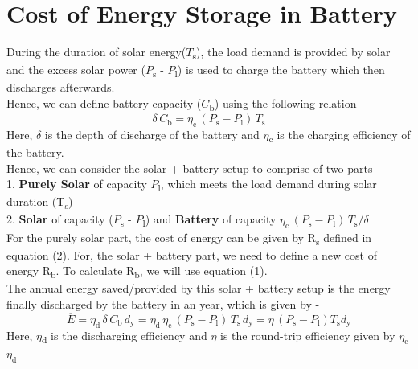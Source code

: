 \documentclass{article}
\newcommand{\Ebar}{\overline{E}}
\begin{document}
\section{Cost of Energy Storage in Battery}
During the duration of solar energy(\(T\)\textsubscript{s}), the load demand is provided by solar and the excess solar power (\(P\)\textsubscript{s} - \(P\)\textsubscript{l}) is used to charge the battery which then discharges afterwards.\\
\newline
Hence, we can define battery capacity (\(C\)\textsubscript{b}) using the following relation -
\begin{equation}
	\delta \, C_\text{b} = \eta_\text{c} \, (P_\text{s} - P_\text{l}) \, T_\text{s}
\end{equation} 
Here, \(\delta \) is the depth of discharge of the battery and \(\eta\)\textsubscript{c} is the charging efficiency of the battery.\\
\newline 
Hence, we can consider the solar + battery setup to comprise of two parts -\\
1. \textbf{Purely Solar} of capacity \(P\)\textsubscript{l}, which meets the load demand during solar duration (T\textsubscript{s})\\
2. \textbf{Solar} of capacity (\(P\)\textsubscript{s} - \(P\)\textsubscript{l}) and \textbf{Battery} of capacity $\eta_\text{c} \, (P_\text{s} - P_\text{l}) \, T_\text{s}/\delta$ \\
\newline
\newline
For the purely solar part, the cost of energy can be given by R\textsubscript{s} defined in equation (2). For, the solar + battery part, we need to define a new cost of energy R\textsubscript{b}. To calculate R\textsubscript{b}, we will use equation (1).\\
\newline
The annual energy saved/provided by this solar + battery setup is the energy finally discharged by the battery in an year, which is given by - \\
\[
    \Ebar = \eta_\text{d} \, \delta \, C_\text{b} \, d_\text{y} = \eta_\text{d} \, \eta_\text{c} \, (P_\text{s} - P_\text{l}) \, T_\text{s} \, d_\text{y} = \eta \, (P_\text{s} - P_\text{l}) T_\text{s} d_\text{y}
\]
Here,
\(\eta\)\textsubscript{d} is the discharging efficiency and
\(\eta\) is the round-trip efficiency given by \(\eta_\text{c}\)\(\eta_\text{d}\)\\
\newline
\end{document}
